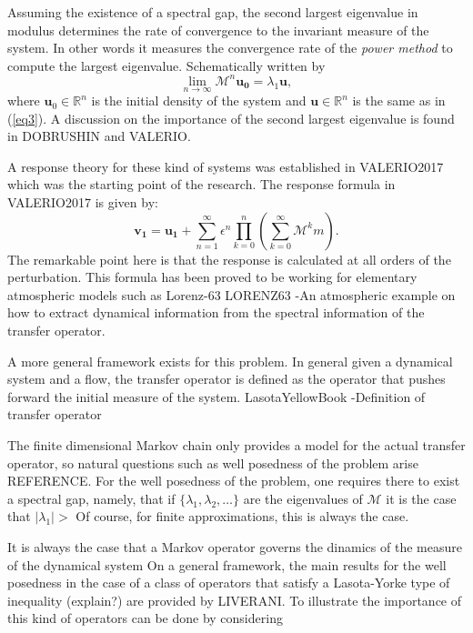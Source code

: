 Assuming the existence of a spectral gap, the second largest eigenvalue in modulus determines the rate of convergence to the invariant measure of the system. In other words it measures the convergence rate of the \emph{power method} to compute the largest eigenvalue. Schematically written by
\begin{equation}\label{powermethod}
\lim _{n\rightarrow \infty}\mathcal{M}^n\mathbf{u_0} = \lambda _1\mathbf{u},
\end{equation}
where $\mathbf{u}_0 \in \mathbb{R}^n$ is the initial density of the system and $\mathbf{u}\in \mathbb{R}^n$ is the same as in (\ref{eq3}). A discussion on the importance of the second largest eigenvalue is found in DOBRUSHIN and VALERIO.


A response theory for these kind of systems was established in VALERIO2017 which was the starting point of the research. The response formula in VALERIO2017 is given by:
\begin{equation}
\mathbf{v_1}=\mathbf{u_1} + \sum_{n=1}^{\infty}\epsilon ^{n} \prod _{k=0}^{n}\left( \sum_{k=0}^{\infty}\mathcal{M}^km \right).
\end{equation}
The remarkable point here is that the response is calculated at all orders of the perturbation. This formula has been proved to be working for elementary atmospheric models such as Lorenz-63 LORENZ63
-An atmospheric example on how to extract dynamical information from the spectral information of the transfer operator.

A more general framework exists for this problem. In general given a dynamical system and a flow, the transfer operator is defined as the operator that pushes forward the initial measure of the system.
LasotaYellowBook
	-Definition of transfer operator

The finite dimensional Markov chain only provides a model for the actual transfer operator, so natural questions such as well posedness of the problem arise REFERENCE. For the well posedness of the problem, one requires there to exist a spectral gap, namely, that if $\{\lambda_1 , \lambda_2 , \ldots \}$ are the eigenvalues of $\mathcal{M}$ it is the case that $\vert \lambda _1 \vert >  $
Of course, for finite approximations, this is always the case.

It is always the case that a Markov operator governs the dinamics of the measure of the dynamical system On a general framework, the main results for the well posedness in the case of a class of operators that satisfy a Lasota-Yorke type of inequality (explain?) are provided by LIVERANI. To illustrate the importance of this kind of operators can be done by considering 


